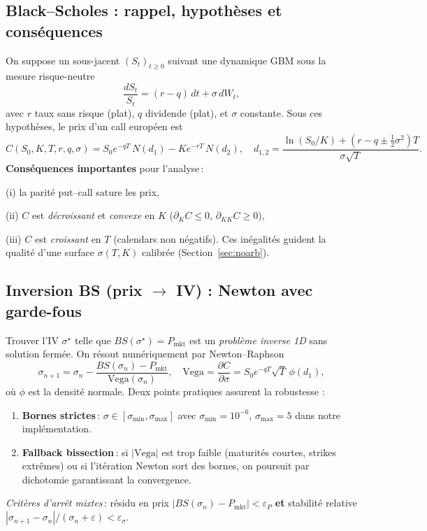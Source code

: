 \documentclass[11pt,a4paper]{article}
\begin{document}
\subsection{Black--Scholes : rappel, hypothèses et conséquences}
On suppose un sous-jacent $(S_t)_{t\ge 0}$ suivant une dynamique GBM sous la mesure risque-neutre
\[
\frac{dS_t}{S_t} = (r-q)\,dt + \sigma\, dW_t,
\]
avec $r$ taux sans risque (plat), $q$ dividende (plat), et $\sigma$ constante. Sous ces hypothèses,
le prix d'un call européen est
\[
C(S_0,K,T,r,q,\sigma)=S_0 e^{-qT}\,N(d_1) - Ke^{-rT}\,N(d_2),\quad
d_{1,2}=\frac{\ln(S_0/K)+(r-q\pm\tfrac12\sigma^2)T}{\sigma\sqrt{T}}.
\]
\textbf{Conséquences importantes} pour l'analyse\,: 

(i) la parité put–call sature les prix,

(ii) $C$ est \emph{décroissant} et \emph{convexe} en $K$ ($\partial_K C\le 0$, $\partial_{KK} C\ge 0$),

(iii) $C$ est \emph{croissant} en $T$ (calendars non négatifs). Ces inégalités guident la qualité
d'une surface $\sigma(T,K)$ calibrée (Section~\ref{sec:noarb}).

\subsection{Inversion BS (prix $\to$ IV) : Newton avec garde-fous}
Trouver l'IV $\sigma^\star$ telle que $BS(\sigma^\star)=P_{\text{mkt}}$ est un \emph{problème inverse 1D}
sans solution fermée. On résout numériquement par Newton–Raphson
\[
\sigma_{n+1}=\sigma_n-\frac{BS(\sigma_n)-P_{\text{mkt}}}{\text{Vega}(\sigma_n)},
\quad
\text{Vega} = \frac{\partial C}{\partial \sigma} = S_0 e^{-qT}\sqrt{T}\,\phi(d_1),
\]
où $\phi$ est la densité normale. Deux points pratiques assurent la robustesse :
\begin{enumerate}[leftmargin=*]
  \item \textbf{Bornes strictes}\,: $\sigma\in [\sigma_{\min},\sigma_{\max}]$ avec
        $\sigma_{\min}=10^{-6}$, $\sigma_{\max}=5$ dans notre implémentation.
  \item \textbf{Fallback bissection}\,: si $|\text{Vega}|$ est trop faible (maturités courtes, strikes extrêmes)
        ou si l'itération Newton sort des bornes, on poursuit par dichotomie garantissant la convergence.
\end{enumerate}
\emph{Critères d'arrêt mixtes}\,: résidu en prix $|BS(\sigma_n)-P_{\text{mkt}}|<\varepsilon_P$ \textbf{et}
stabilité relative $|\sigma_{n+1}-\sigma_n|/(\sigma_n+\varepsilon)<\varepsilon_\sigma$.
\end{document}

